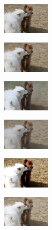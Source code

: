 \begin{figure}[ht]
	\centering
	\captionsetup[subfigure]{labelformat=empty}
	\begin{subfigure}[b]{0.1\textwidth}
		\centering
		\includegraphics[width=2.4cm]{orig - filter.jpeg}
		
	\end{subfigure}
	\hfill
	\begin{subfigure}[b]{0.1\textwidth}
		\includegraphics[width=2.4cm]{orig - filter - blur.jpeg}
		
	\end{subfigure}
	\hfill
	\begin{subfigure}[b]{0.1\textwidth}
		\includegraphics[width=2.4cm]{orig - filter - cartoon.jpeg}
		
	\end{subfigure}
	\hfill
	\begin{subfigure}[b]{0.1\textwidth}
		\includegraphics[width=2.4cm]{orig - filter - man contr (2).jpg}
		
	\end{subfigure}
	\hfill
	\begin{subfigure}[b]{0.1\textwidth}
		\includegraphics[width=2.4cm]{orig - filter - man contr (1).jpg}
		
	\end{subfigure}
	\hfill
	\begin{subfigure}[b]{0.1\textwidth}
		\includegraphics[width=2.4cm]{orig - filter - lumin (1).jpeg}
		

\end{subfigure}
\end{figure}
